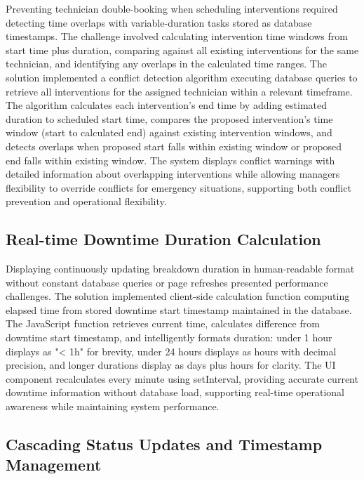 Preventing technician double-booking when scheduling interventions required detecting time overlaps with variable-duration tasks stored as database timestamps. The challenge involved calculating intervention time windows from start time plus duration, comparing against all existing interventions for the same technician, and identifying any overlaps in the calculated time ranges. The solution implemented a conflict detection algorithm executing database queries to retrieve all interventions for the assigned technician within a relevant timeframe. The algorithm calculates each intervention's end time by adding estimated duration to scheduled start time, compares the proposed intervention's time window (start to calculated end) against existing intervention windows, and detects overlaps when proposed start falls within existing window or proposed end falls within existing window. The system displays conflict warnings with detailed information about overlapping interventions while allowing managers flexibility to override conflicts for emergency situations, supporting both conflict prevention and operational flexibility.

\subsection{Real-time Downtime Duration Calculation}

Displaying continuously updating breakdown duration in human-readable format without constant database queries or page refreshes presented performance challenges. The solution implemented client-side calculation function computing elapsed time from stored downtime start timestamp maintained in the database. The JavaScript function retrieves current time, calculates difference from downtime start timestamp, and intelligently formats duration: under 1 hour displays as "< 1h" for brevity, under 24 hours displays as hours with decimal precision, and longer durations display as days plus hours for clarity. The UI component recalculates every minute using setInterval, providing accurate current downtime information without database load, supporting real-time operational awareness while maintaining system performance.

\subsection{Cascading Status Updates and Timestamp Management}

